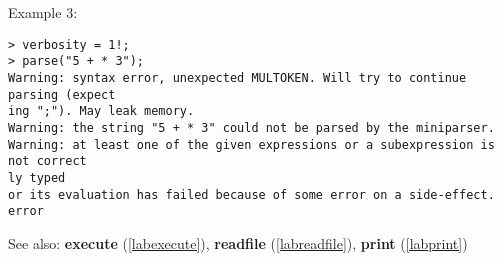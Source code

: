 \noindent Example 3: 
\begin{center}\begin{minipage}{15cm}\begin{Verbatim}[frame=single]
> verbosity = 1!;
> parse("5 + * 3");
Warning: syntax error, unexpected MULTOKEN. Will try to continue parsing (expect
ing ";"). May leak memory.
Warning: the string "5 + * 3" could not be parsed by the miniparser.
Warning: at least one of the given expressions or a subexpression is not correct
ly typed
or its evaluation has failed because of some error on a side-effect.
error
\end{Verbatim}
\end{minipage}\end{center}
See also: \textbf{execute} (\ref{labexecute}), \textbf{readfile} (\ref{labreadfile}), \textbf{print} (\ref{labprint})
